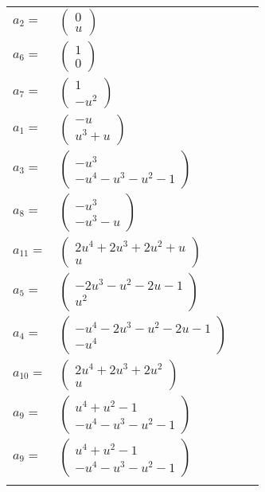\documentclass[1p]{elsarticle_modified}
\theoremstyle{definition}
\begin{document}
\begin{tabular}{m{7pt} m{180pt} m{7pt} m{180pt} }
\flushright $a_{2}=$&$\begin{pmatrix}0\\u\end{pmatrix}$ \\
\flushright $a_{6}=$&$\begin{pmatrix}1\\0\end{pmatrix}$ \\
\flushright $a_{7}=$&$\begin{pmatrix}1\\- u^2\end{pmatrix}$ \\
\flushright $a_{1}=$&$\begin{pmatrix}- u\\u^3+u\end{pmatrix}$ \\
\flushright $a_{3}=$&$\begin{pmatrix}- u^3\\- u^4- u^3- u^2-1\end{pmatrix}$ \\
\flushright $a_{8}=$&$\begin{pmatrix}- u^3\\- u^3- u\end{pmatrix}$ \\
\flushright $a_{11}=$&$\begin{pmatrix}2 u^4+2 u^3+2 u^2+u\\u\end{pmatrix}$ \\
\flushright $a_{5}=$&$\begin{pmatrix}-2 u^3- u^2-2 u-1\\u^2\end{pmatrix}$ \\
\flushright $a_{4}=$&$\begin{pmatrix}- u^4-2 u^3- u^2-2 u-1\\- u^4\end{pmatrix}$ \\
\flushright $a_{10}=$&$\begin{pmatrix}2 u^4+2 u^3+2 u^2\\u\end{pmatrix}$ \\
\flushright $a_{9}=$&$\begin{pmatrix}u^4+u^2-1\\- u^4- u^3- u^2-1\end{pmatrix}$\\ \flushright $a_{9}=$&$\begin{pmatrix}u^4+u^2-1\\- u^4- u^3- u^2-1\end{pmatrix}$\\&\end{tabular}
\end{document}
